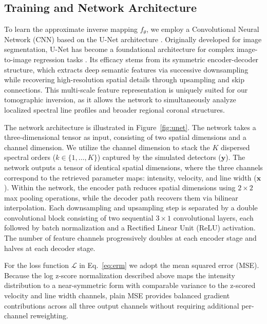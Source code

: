 \documentclass[linenumbers,twocolumn]{aastex7}
\begin{document}
\subsection{Training and Network Architecture} \label{sec:training}
To learn the approximate inverse mapping $f_\theta$, we employ a Convolutional
Neural Network (CNN) based on the U-Net architecture \citep{ronneberger2015u}.
Originally developed for image segmentation, U-Net has become a foundational
architecture for complex image-to-image regression tasks \citep{isola2017image,
jin2017deep, ulyanov2018deep, zhou2019unet++}. Its efficacy stems from its
symmetric encoder-decoder structure, which extracts deep semantic features via
successive downsampling while recovering high-resolution spatial details through
upsampling and skip connections. This multi-scale feature representation
\citep{ye2019understanding, liu2022learning} is uniquely suited for our
tomographic inversion, as it allows the network to simultaneously analyze
localized spectral line profiles and broader regional coronal structures.

The network architecture is illustrated in Figure~\ref{fig:unet}. The network
takes a three-dimensional tensor as input, consisting of two spatial dimensions
and a channel dimension. We utilize the channel dimension to stack the $K$
dispersed spectral orders ($k \in \{1,\dots,K\}$) captured by the
simulated detectors ($\bm y$). The network outputs a tensor of identical spatial
dimensions, where the three channels correspond to the retrieved parameter maps:
intensity, velocity, and line width ($\bm{x}$). Within the network, the encoder
path reduces spatial dimensions using $2 \times 2$ max pooling operations, while
the decoder path recovers them via bilinear interpolation. Each downsampling and
upsampling step is separated by a double convolutional block consisting of two
sequential $3 \times 1$ convolutional layers, each followed by batch
normalization and a Rectified Linear Unit (ReLU) activation. The number of
feature channels progressively doubles at each encoder stage and halves at each
decoder stage.

For the loss function $\mathcal{L}$ in Eq.~\eqref{eq:erm} we adopt the mean squared
error (MSE). Because the log z-score normalization described above maps the
intensity distribution to a near-symmetric form with comparable variance to the
z-scored velocity and line width channels, plain MSE provides balanced gradient
contributions across all three output channels without requiring additional
per-channel reweighting.
\end{document}
